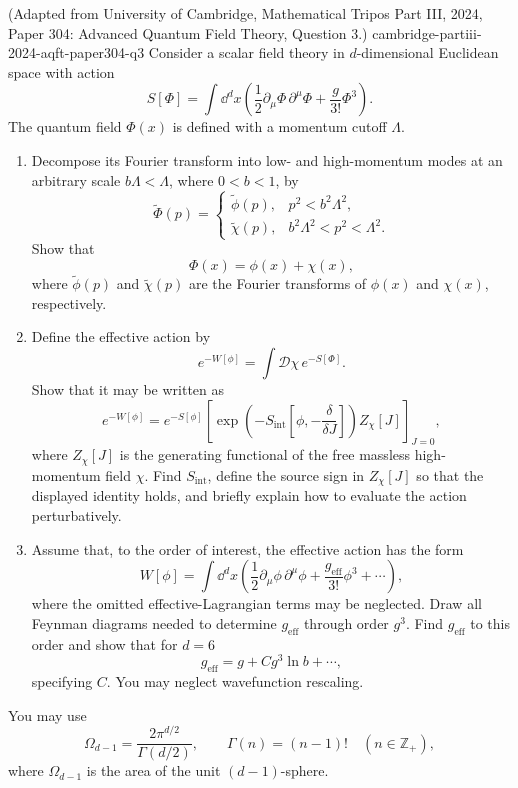 \begin{enumerate}
  {(Adapted from University of Cambridge, Mathematical Tripos Part III, 2024, Paper 304: Advanced Quantum Field Theory, Question 3.)}
  {cambridge-partiii-2024-aqft-paper304-q3}
Consider a scalar field theory in \(d\)-dimensional Euclidean space with
action
\[
 S[\Phi]=\int \dd^dx\left(
 \frac12\partial_\mu\Phi\,\partial^\mu\Phi+\frac{g}{3!}\Phi^3
 \right).
\]
The quantum field \(\Phi(x)\) is defined with a momentum cutoff \(\Lambda\).
\begin{enumerate}
\item
Decompose its Fourier transform into low- and high-momentum modes at an
arbitrary scale \(b\Lambda<\Lambda\), where \(0<b<1\), by
\[
 \widetilde\Phi(p)=
 \begin{cases}
  \widetilde\phi(p),&p^2<b^2\Lambda^2,\\
  \widetilde\chi(p),&b^2\Lambda^2<p^2<\Lambda^2.
 \end{cases}
\]
Show that
\[
 \Phi(x)=\phi(x)+\chi(x),
\]
where \(\widetilde\phi(p)\) and \(\widetilde\chi(p)\) are the Fourier
transforms of \(\phi(x)\) and \(\chi(x)\), respectively.
\item
Define the effective action by
\[
 e^{-W[\phi]}=\int\mathcal D\chi\,e^{-S[\Phi]}.
\]
Show that it may be written as
\[
 e^{-W[\phi]}=e^{-S[\phi]}
 \left[
  \exp\left(-S_{\mathrm{int}}
  \left[\phi,-\frac{\delta}{\delta J}\right]\right)Z_\chi[J]
 \right]_{J=0},
\]
where \(Z_\chi[J]\) is the generating functional of the free massless
high-momentum field \(\chi\).  Find \(S_{\mathrm{int}}\), define the source
sign in \(Z_\chi[J]\) so that the displayed identity holds, and briefly
explain how to evaluate the action perturbatively.
\item
Assume that, to the order of interest, the effective action has the form
\[
 W[\phi]=\int \dd^dx\left(
 \frac12\partial_\mu\phi\,\partial^\mu\phi
 +\frac{g_{\mathrm{eff}}}{3!}\phi^3+\cdots\right),
\]
where the omitted effective-Lagrangian terms may be neglected.  Draw all
Feynman diagrams needed to determine \(g_{\mathrm{eff}}\) through order
\(g^3\).  Find \(g_{\mathrm{eff}}\) to this order and show that for \(d=6\)
\[
 g_{\mathrm{eff}}=g+Cg^3\ln b+\cdots,
\]
specifying \(C\).  You may neglect wavefunction rescaling.
\end{enumerate}
You may use
\[
 \Omega_{d-1}=\frac{2\pi^{d/2}}{\Gamma(d/2)},
 \qquad \Gamma(n)=(n-1)!\quad(n\in\mathbb Z_+),
\]
where \(\Omega_{d-1}\) is the area of the unit \((d-1)\)-sphere.


\end{enumerate}
